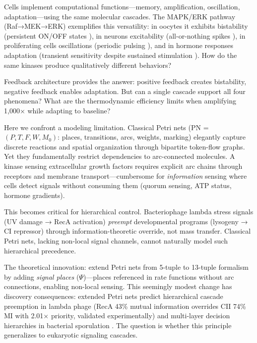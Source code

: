 \documentclass[twocolumn,11pt]{article}
\begin{document}
Cells implement computational functions—memory, amplification, oscillation, adaptation—using the same molecular cascades. The MAPK/ERK pathway (Raf→MEK→ERK) exemplifies this versatility: in oocytes it exhibits bistability (persistent ON/OFF states \citep{ferrell2009}), in neurons excitability (all-or-nothing spikes \citep{sasagawa2005}), in proliferating cells oscillations (periodic pulsing \citep{shankaran2009}), and in hormone responses adaptation (transient sensitivity despite sustained stimulation \citep{mackeigan2005, amit2007}). How do the same kinases produce qualitatively different behaviors?

Feedback architecture provides the answer: positive feedback creates bistability, negative feedback enables adaptation. But can a single cascade support all four phenomena? What are the thermodynamic efficiency limits when amplifying 1,000× while adapting to baseline?

Here we confront a modeling limitation. Classical Petri nets (PN = $(P, T, F, W, M_0)$: places, transitions, arcs, weights, marking) elegantly capture discrete reactions and spatial organization through bipartite token-flow graphs. Yet they fundamentally restrict dependencies to arc-connected molecules. A kinase sensing extracellular growth factors requires explicit arc chains through receptors and membrane transport—cumbersome for \emph{information} sensing where cells detect signals without consuming them (quorum sensing, ATP status, hormone gradients).

This becomes critical for hierarchical control. Bacteriophage lambda stress signals (UV damage → RecA activation) \emph{preempt} developmental programs (lysogeny → CI repressor) through information-theoretic override, not mass transfer. Classical Petri nets, lacking non-local signal channels, cannot naturally model such hierarchical precedence.

The theoretical innovation: extend Petri nets from 5-tuple to 13-tuple formalism by adding \emph{signal places} ($\Psi$)—places referenced in rate functions without arc connections, enabling non-local sensing. This seemingly modest change has discovery consequences: extended Petri nets predict hierarchical cascade preemption in lambda phage (RecA 43\% mutual information overrides CII 74\% MI with 2.01× priority, validated experimentally) and multi-layer decision hierarchies in bacterial sporulation \citep{simao2025thermodynamic}. The question is whether this principle generalizes to eukaryotic signaling cascades.
\end{document}
